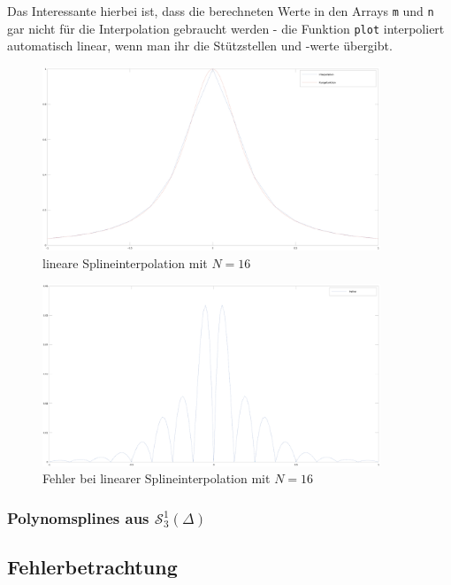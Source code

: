 \documentclass[ngerman,a4paper]{texmf/tex/latex/mathscript/mathscript}
\begin{document}
	Das Interessante hierbei ist, dass die berechneten Werte in den Arrays \texttt{m} und \texttt{n} gar nicht für die Interpolation gebraucht werden - die Funktion \texttt{plot} interpoliert automatisch linear, wenn man ihr die Stützstellen und -werte übergibt.
	
	\begin{figure}[h]
		\centering
		\includegraphics[width=0.9\textwidth]{images/Runge_lineare_Interpolation.png}
		\caption{lineare Splineinterpolation mit $N=16$}
	\end{figure}

	\begin{figure}[h]
		\centering
		\includegraphics[width=0.9\textwidth]{images/Runge_lineare_Interpolation_Fehler.png}
		\caption{Fehler bei linearer Splineinterpolation mit $N=16$}
	\end{figure}
	
	\subsubsection{Polynomsplines aus $\mathcal{S}_3^1(\Delta)$}
	
	\subsection{Fehlerbetrachtung}
	
\end{document}
